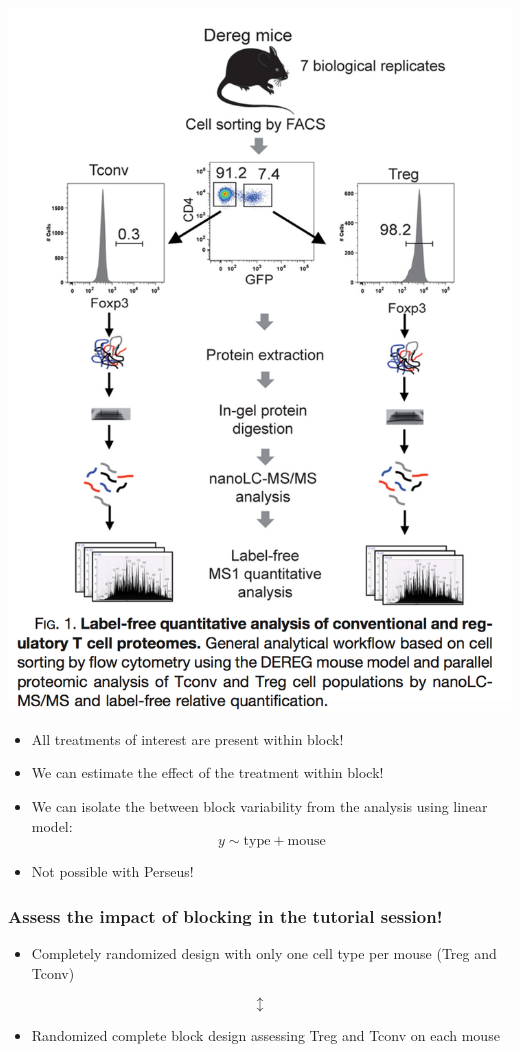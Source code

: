 \documentclass[
]{article}
\providecommand{\tightlist}{%
  \setlength{\itemsep}{0pt}\setlength{\parskip}{0pt}}
\begin{document}
\includegraphics[width=0.5\linewidth]{./figures/mouseTcell_RCB_design}

\begin{itemize}
\tightlist
\item
  All treatments of interest are present within block!
\item
  We can estimate the effect of the treatment within block!
\item
  We can isolate the between block variability from the analysis using
  linear model: \[ 
  y \sim \text{type} + \text{mouse}
  \]
\item
  Not possible with Perseus!
\end{itemize}

\hypertarget{assess-the-impact-of-blocking-in-the-tutorial-session}{%
\subsubsection{Assess the impact of blocking in the tutorial
session!}\label{assess-the-impact-of-blocking-in-the-tutorial-session}}

\begin{itemize}
\tightlist
\item
  Completely randomized design with only one cell type per mouse (Treg
  and Tconv)
\end{itemize}

\[\updownarrow\]

\begin{itemize}
\tightlist
\item
  Randomized complete block design assessing Treg and Tconv on each
  mouse
\end{itemize}
\end{document}
